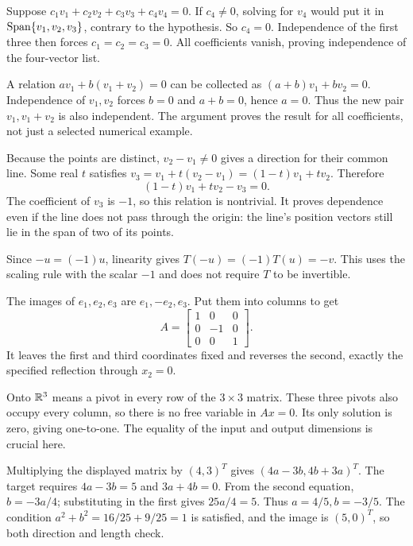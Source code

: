 Suppose $c_1v_1+c_2v_2+c_3v_3+c_4v_4=0$.
If $c_4\ne0$, solving for $v_4$ would put it in
$\operatorname{Span}\{v_1,v_2,v_3\}$, contrary to the hypothesis. So $c_4=0$.
Independence of the first three then forces $c_1=c_2=c_3=0$.
All coefficients vanish, proving independence of the four-vector list.

A relation $av_1+b(v_1+v_2)=0$ can be collected as
$(a+b)v_1+bv_2=0$. Independence of $v_1,v_2$ forces
$b=0$ and $a+b=0$, hence $a=0$. Thus the new pair
$v_1,v_1+v_2$ is also independent. The argument proves the result
for all coefficients, not just a selected numerical example.

Because the points are distinct, $v_2-v_1\ne0$ gives a direction
for their common line. Some real $t$ satisfies
$v_3=v_1+t(v_2-v_1)=(1-t)v_1+tv_2$. Therefore
\[
 (1-t)v_1+tv_2-v_3=0.
\]
The coefficient of $v_3$ is $-1$, so this relation is nontrivial.
It proves dependence even if the line does not pass through the origin:
the line's position vectors still lie in the span of two of its points.

Since $-u=(-1)u$, linearity gives
$T(-u)=(-1)T(u)=-v$. This uses the scaling rule with the scalar
$-1$ and does not require $T$ to be invertible.

The images of $e_1,e_2,e_3$ are $e_1,-e_2,e_3$.
Put them into columns to get
\[
 A=\begin{bmatrix}1&0&0\\0&-1&0\\0&0&1\end{bmatrix}.
\]
It leaves the first and third coordinates fixed and reverses the second,
exactly the specified reflection through $x_2=0$.

Onto $\mathbb{R}^3$ means a pivot in every row of the $3\times3$ matrix.
These three pivots also occupy every column, so there is no free
variable in $Ax=0$. Its only solution is zero, giving one-to-one.
The equality of the input and output dimensions is crucial here.

Multiplying the displayed matrix by $(4,3)^T$ gives
$(4a-3b,4b+3a)^T$. The target requires
$4a-3b=5$ and $3a+4b=0$. From the second equation,
$b=-3a/4$; substituting in the first gives $25a/4=5$.
Thus $\boxed{a=4/5,b=-3/5}$.
The condition $a^2+b^2=16/25+9/25=1$ is satisfied, and the
image is $(5,0)^T$, so both direction and length check.

